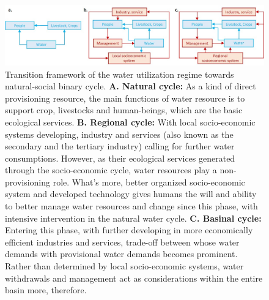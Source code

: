 \documentclass[9pt, twocolumn, twoside, lineno]{pnas-new}
\begin{document}
\begin{figure}[thbp]
	\centering
	\includegraphics[width=\linewidth]{../../figures/main/transition.jpg}
	\caption{
		Transition framework of the water utilization regime towards natural-social binary cycle.
		\textbf{A. Natural cycle:} As a kind of direct provisioning resource, the main functions of water resource is to support crop, livestocks and human-beings, which are the basic ecological services.
		\textbf{B. Regional cycle:} With local socio-economic systems developing, industry and services (also known as the secondary and the tertiary industry) calling for further water consumptions.
		However, as their ecological services generated through the socio-economic cycle, water resources play a non-provisioning role. What's more, better organized socio-economic system and developed technology gives humans the will and ability to better manage water resources and change since this phase, with intensive intervention in the natural water cycle. 
		\textbf{C. Basinal cycle:} Entering this phase, with further developing in more economically efficient industries and services, trade-off between whose water demands with provisional water demands becomes prominent. Rather than determined by local socio-economic systems, water withdrawals and management act as considerations within the entire basin more, therefore. 
	}
	\label{fig:summary}
\end{figure}
\end{document}
